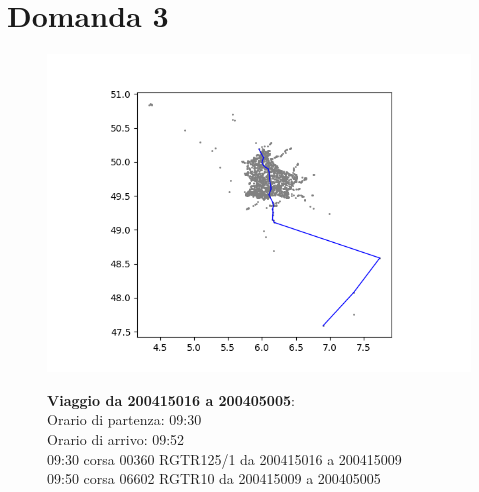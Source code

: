 \documentclass{article}
\begin{document}
\section*{Domanda 3}
\begin{figure}[H]
	\begin{minipage}{0.55\linewidth}
		\centering
		\hspace*{-3cm}\includegraphics[width=1.0\linewidth, valign=t]{figures/Figure_1}
	\end{minipage}
	\hspace*{-2cm}\begin{minipage}{0.7\linewidth}
		\textbf{Viaggio da 200415016 a 200405005}:\\
		Orario di partenza: 09:30\\
		Orario di arrivo: 09:52\\
		09:30 corsa 00360 RGTR125/1 da 200415016 a 200415009\\
		09:50 corsa 06602 RGTR10 da 200415009 a 200405005
			\end{minipage}
\end{figure}
\end{document}

